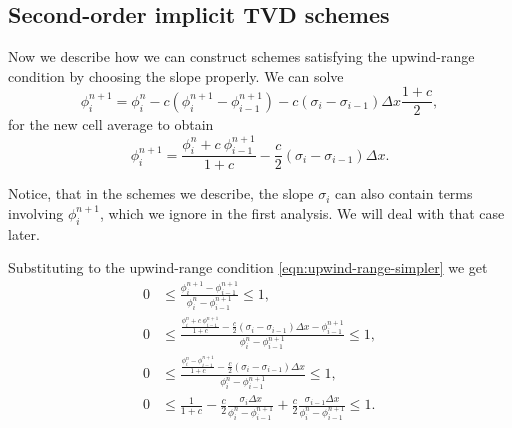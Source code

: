 \documentclass[../thesis.tex]{subfiles}
\begin{document}
\subsection[]{Second-order implicit TVD schemes}
Now we describe how we can construct schemes satisfying the upwind-range condition by choosing the slope properly.
We can solve
\begin{equation}
    \phi_{i}^{n+1}
    = \phi_{i}^{n} - c\left(
        \phi_{i}^{n+1}
        - \phi_{i-1}^{n+1}
        \right)
        -c\left(
        \sigma_{i} - \sigma_{i-1}
        \right)\Delta x\frac{1+c}{2},
\end{equation}
for the new cell average to obtain
\begin{equation}\label{eqn: second order implicit - solution}
    \phi_{i}^{n+1} =
    \frac{\phi_{i}^{n} +
    c~\phi_{i-1}^{n+1}}{1+c}
    -\frac{c}{2}\left(
        \sigma_{i} - \sigma_{i-1}
        \right)\Delta x.
\end{equation}
\begin{remark}
    Notice, that in the schemes we describe, the slope \(\sigma_{i}\) can also contain terms involving \(\phi_{i}^{n+1}\), which we ignore in the first analysis.
    We will deal with that case later.
\end{remark}
Substituting to the upwind-range condition \eqref{eqn:upwind-range-simpler} we get
\begin{equation}
    \begin{split}\label{eqn: urc-all c-necessary}
        0
        &\leq
        \frac{\phi_{i}^{n+1} - \phi_{i-1}^{n+1}}
        {\phi_{i}^{n} - \phi_{i-1}^{n+1}}
        \leq
        1,
        \\
        0
        &\leq
        \frac{
        \frac{\phi_{i}^{n} +
        c~\phi_{i-1}^{n+1}}{1+c}
        -\frac{c}{2}\left(
            \sigma_{i} - \sigma_{i-1}
            \right)\Delta x - \phi_{i-1}^{n+1}}{\phi_{i}^{n} - \phi_{i-1}^{n+1}}
        \leq
        1,
        \\
        0
        &\leq
        \frac{
        \frac{\phi_{i}^{n} - \phi_{i-1}^{n+1}}{1+c}
        -\frac{c}{2}\left(
            \sigma_{i} - \sigma_{i-1}
            \right)\Delta x}{\phi_{i}^{n} - \phi_{i-1}^{n+1}}
        \leq
        1,
        \\
        0
        &\leq
        \frac{1}{1+c}
        -\frac{c}{2}
        \frac{\sigma_{i}\Delta x}
        {\phi_{i}^{n} - \phi_{i-1}^{n+1}}
        +\frac{c}{2}
        \frac{\sigma_{i-1}\Delta x}
        {\phi_{i}^{n} - \phi_{i-1}^{n+1}}
        \leq
        1.
    \end{split}
\end{equation}
\end{document}
